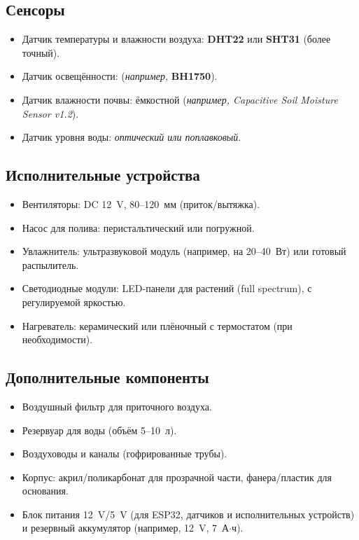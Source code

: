 \documentclass[a4paper,12pt]{article}
\begin{document}
\subsection*{Сенсоры}
\begin{itemize}
    \item Датчик температуры и влажности воздуха: \textbf{DHT22} или \textbf{SHT31} (более точный).
    \item Датчик освещённости: (\textit{например,} \textbf{BH1750}).
    \item Датчик влажности почвы: ёмкостной (\textit{например, Capacitive Soil Moisture Sensor v1.2}).
    \item Датчик уровня воды: \textit{оптический или поплавковый}.
\end{itemize}

\subsection*{Исполнительные устройства}
\begin{itemize}
    \item Вентиляторы: DC 12~V, 80--120~мм (приток/вытяжка).
    \item Насос для полива: перистальтический или погружной.
    \item Увлажнитель: ультразвуковой модуль (например, на 20--40~Вт) или готовый распылитель.
    \item Светодиодные модули: LED-панели для растений (full spectrum), с регулируемой яркостью.
    \item Нагреватель: керамический или плёночный с термостатом (при необходимости).
\end{itemize}

\subsection*{Дополнительные компоненты}
\begin{itemize}
    \item Воздушный фильтр для приточного воздуха.
    \item Резервуар для воды (объём 5--10~л).
    \item Воздуховоды и каналы (гофрированные трубы).
    \item Корпус: акрил/поликарбонат для прозрачной части, фанера/пластик для основания.
    \item Блок питания 12~V/5~V (для ESP32, датчиков и исполнительных устройств) и резервный аккумулятор (например, 12~V, 7~А$\cdot$ч).
\end{itemize}
\end{document}
